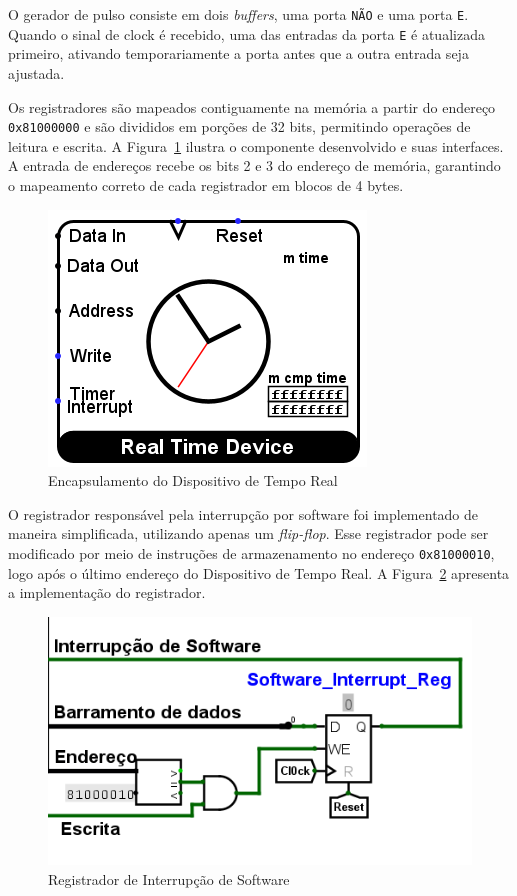 \documentclass[
	12pt,				%
	openright,			%
	oneside,			%
	a4paper,			%
	english,			%
	french,				%
	spanish,			%
	brazil,				%
	]{abntex2}
\begin{document}
O gerador de pulso consiste em dois \textit{buffers}, uma porta \texttt{NÃO} e uma porta \texttt{E}. Quando o sinal de clock é recebido, uma das entradas da porta \texttt{E} é atualizada primeiro, ativando temporariamente a porta antes que a outra entrada seja ajustada.

Os registradores são mapeados contiguamente na memória a partir do endereço \texttt{0x81000000} e são divididos em porções de 32 bits, permitindo operações de leitura e escrita. A Figura~\ref{fig:RTD_Component} ilustra o componente desenvolvido e suas interfaces. A entrada de endereços recebe os bits 2 e 3 do endereço de memória, garantindo o mapeamento correto de cada registrador em blocos de 4 bytes.

\begin{figure}[h]
    \centering
    \includegraphics[width=0.25\linewidth]{ProcessoDesenvolvimento/Arquitetura/RealTimeDeviceComponent.png}
    \caption{Encapsulamento do Dispositivo de Tempo Real}
    \label{fig:RTD_Component}
\end{figure}

O registrador responsável pela interrupção por software \cite[p.8]{risc-v_risc-v_2022} foi implementado de maneira simplificada, utilizando apenas um \textit{flip-flop}. Esse registrador pode ser modificado por meio de instruções de armazenamento no endereço \texttt{0x81000010}, logo após o último endereço do Dispositivo de Tempo Real. A Figura~\ref{fig:SoftwareInterruptReg} apresenta a implementação do registrador.

\begin{figure}[h]
    \centering
    \includegraphics[width=0.5\linewidth]{ProcessoDesenvolvimento/Arquitetura/SoftwareInterruptRegister.png}
    \caption{Registrador de Interrupção de Software}
    \label{fig:SoftwareInterruptReg}
\end{figure}
\end{document}
